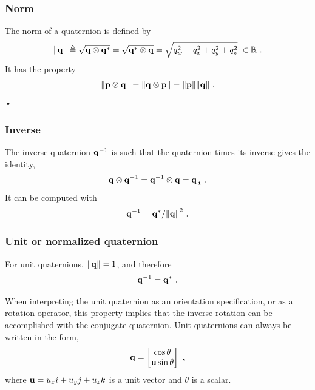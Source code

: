 \subsubsection{Norm}

The norm of a quaternion is defined by
%
\begin{align}\label{equ:q_norm}
{\left\|{\bf q}\right\|} \triangleq \sqrt{{\bf q}\otimes{\bf q}^*} = \sqrt{{\bf q}^*\otimes{\bf q}} = \sqrt{q_w^2 +q_x^2 +q_y^2 +q_z^2 } ~\in {\mathbb R} ~.
\end{align}
%
It has the property
%
\begin{align}
{\left\|{\bf p}\otimes{\bf q}\right\|} = {\left\|{\bf q}\otimes{\bf p}\right\|} = {\left\|{\bf p}\right\|}{\left\|{\bf q}\right\|}~. \label{equ:norm_prod}
\end{align}•

\subsubsection{Inverse}

The inverse quaternion ${\bf q}^{-1}$ is such that the quaternion times its inverse gives the identity,
%
\begin{align}
{\bf q}\otimes{\bf q}^{-1} = {\bf q}^{-1}\otimes{\bf q} = {\bf q}_{{\,}_{\bf 1}}~.
\end{align}
%
It can be computed with
%
\begin{align}
{\bf q}^{-1} = {\bf q}^*/{\left\|{\bf q}\right\|}^2~.
\end{align}

\subsubsection{Unit or normalized quaternion}

For unit quaternions, ${\left\|{\bf q}\right\|}=1$, and therefore
%
\begin{align}
{\bf q}^{-1} = {\bf q}^*~.
\end{align}


When interpreting the unit quaternion as an orientation specification, or as a rotation operator, this property implies that the inverse rotation can be accomplished with the conjugate quaternion. Unit quaternions can always be written in the form,
%
\begin{align}
{\bf q} = \begin{bmatrix}
\cos\theta \\ {\bf u}\sin\theta
\end{bmatrix}
~,
\end{align}
%
where ${\bf u} = u_x i + u_y j + u_z k$ is a unit vector and $\theta$ is a scalar. 

